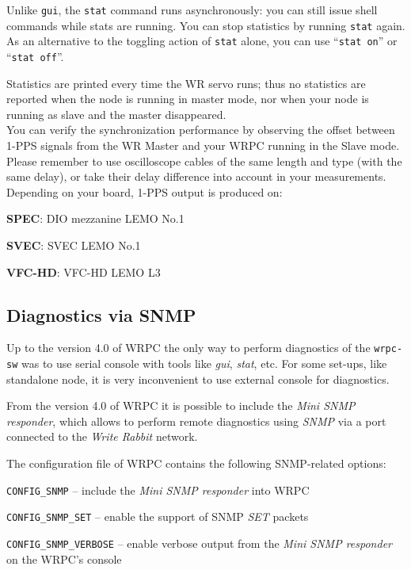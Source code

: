 \documentclass[a4paper, 12pt]{article}
\begin{document}
\vspace{1em}
Unlike \texttt{gui}, the \texttt{stat} command runs asynchronously: you can still
issue shell commands while stats are running. You can stop statistics by running
\texttt{stat} again. As an alternative to the toggling action of \texttt{stat}
alone, you can use ``\texttt{stat on}'' or ``\texttt{stat off}''.

Statistics are printed every time the WR servo runs; thus no statistics
are reported when the node is running in master mode, nor when your node
is running as slave and the master disappeared.\\

You can verify the synchronization performance by observing the offset between
1-PPS signals from the WR Master and your WRPC running in the Slave mode. Please
remember to use oscilloscope cables of the same length and type (with the same
delay), or take their delay difference into account in your measurements.
Depending on your board, 1-PPS output is produced on:
\begin{itemize*}
  \item \textbf{SPEC}: DIO mezzanine LEMO No.1
  \item \textbf{SVEC}: SVEC LEMO No.1
  \item \textbf{VFC-HD}: VFC-HD LEMO L3
\end{itemize*}

\subsection{Diagnostics via SNMP}
\label{Diagnostics via SNMP}

Up to the version 4.0 of WRPC the only way to perform diagnostics
of the \texttt{wrpc-sw} was to use serial console with tools like \textit{gui}, \textit{stat},
etc. For some set-ups, like standalone node, it is very inconvenient to use
external console for diagnostics.

From the version 4.0 of WRPC it is possible to include the \textit{Mini
SNMP responder}, which allows to perform remote diagnostics using \textit{SNMP} via
a port connected to the \textit{Write Rabbit} network.

The configuration file of WRPC contains the following
SNMP-related options:
\begin{itemize*}
\item \texttt{CONFIG\_SNMP} -- include the \textit{Mini SNMP responder} into WRPC
\item \texttt{CONFIG\_SNMP\_SET} -- enable the support of SNMP \textit{SET} packets
\item \texttt{CONFIG\_SNMP\_VERBOSE} -- enable verbose output from the \textit{Mini SNMP
      responder} on the WRPC's console
\end{itemize*}
\end{document}
